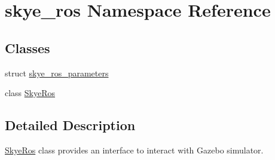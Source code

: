 \hypertarget{namespaceskye__ros}{\section{skye\-\_\-ros Namespace Reference}
\label{namespaceskye__ros}
}
\subsection*{Classes}
\begin{DoxyCompactItemize}
\item 
struct \hyperlink{structskye__ros_1_1skye__ros__parameters}{skye\-\_\-ros\-\_\-parameters}
\item 
class \hyperlink{classskye__ros_1_1_skye_ros}{Skye\-Ros}
\end{DoxyCompactItemize}


\subsection{Detailed Description}
\hyperlink{classskye__ros_1_1_skye_ros}{Skye\-Ros} class provides an interface to interact with Gazebo simulator. 